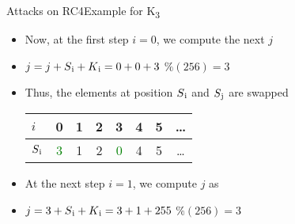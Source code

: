 \documentclass[
	aspectratio=169,	%
	onlytextwidth,		%
	t,					%
	]{beamer}
\begin{document}
\begin{frame}[fragile]{Attacks on RC4}{Example for K\textsubscript{3}}
	\begin{itemize}
		\item Now, at the first step $i=0$, we compute the next $j$
		\item $j = j + S\textsubscript{i} + K\textsubscript{i} = 0 + 0 + 3$ $\% (256) = 3$
		\item Thus, the elements at position $S\textsubscript{i}$ and $S\textsubscript{j}$ are swapped
		\medskip
		\begin{table}[h!]
			\begin{center}
			  \begin{tabular}{l|c|c|c|c|c|c|c}
				$i$ & 0 & 1 & 2 & 3 & 4 & 5 & \dots\\
				\hline
				$S\textsubscript{i}$ & \textcolor{green}{3} & 1 & 2 & \textcolor{green}{0} & 4 & 5 & \dots\\
			  \end{tabular}
			\end{center}
		  \end{table}
		\item At the next step $i = 1$, we compute $j$ as
		\item $j = 3 + S\textsubscript{i} + K\textsubscript{i} = 3 + 1 + 255$ $\% (256) = 3$
	\end{itemize}
\end{frame}
\end{document}

